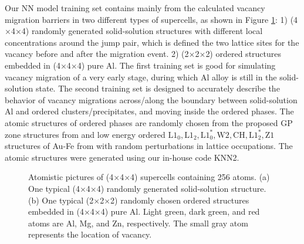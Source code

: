 Our \ac{NN} model training set contains mainly from the calculated vacancy migration barriers in two different types of supercells, as shown in Figure \ref{Chap:Al/Vac:fig:atomic_illu}: 1) (4$\times$4$\times$4) randomly generated solid-solution structures with different local concentrations around the jump pair, which is defined the two lattice sites for the vacancy before and after the migration event. 2) (2$\times$2$\times$2) ordered structures embedded in (4$\times$4$\times$4) pure Al. The first training set is good for simulating vacancy migration of a very early stage, during which Al alloy is still in the solid-solution state. The second training set is designed to accurately describe the behavior of vacancy migrations across/along the boundary between solid-solution Al and ordered clusters/precipitates, and moving inside the ordered phases. The atomic structures of ordered phases are randomly chosen from the proposed GP zone structures from \cite{berg2001gp} and low energy ordered $\text{L1}_\text{0}, \text{L1}_\text{2}, \text{L1}_\text{0}^*, \text{W2}, \text{CH}, \text{L1}_\text{2}^*, \text{Z1}$ structures of Au-Fe from \cite{zhuravlev2017phase} with random perturbations in lattice occupations. The atomic structures were generated using our in-house code KNN2\cite{Zhang2020KNN2}. 

\begingroup
\begin{figure}[!ht]
  \centering
\caption[Atomistic pictures of (4$\times$4$\times$4) supercells containing 256 atoms.]{Atomistic pictures of (4$\times$4$\times$4) supercells containing 256 atoms. (a) One typical (4$\times$4$\times$4) randomly generated solid-solution structure. (b) One typical (2$\times$2$\times$2) randomly chosen ordered structures embedded in (4$\times$4$\times$4) pure Al. Light green, dark green, and red atoms are Al, Mg, and Zn, respectively. The small gray atom represents the location of vacancy.}
\label{Chap:Al/Vac:fig:atomic_illu}
\end{figure}
\endgroup


